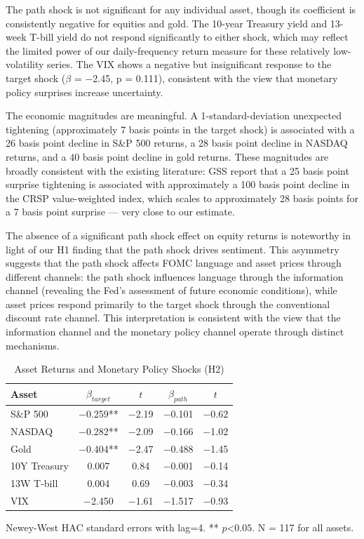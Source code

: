 \documentclass[12pt]{article}
\begin{document}
The path shock is not significant for any individual asset, though its coefficient is consistently negative for equities and gold. The 10-year Treasury yield and 13-week T-bill yield do not respond significantly to either shock, which may reflect the limited power of our daily-frequency return measure for these relatively low-volatility series. The VIX shows a negative but insignificant response to the target shock ($\beta$ = $-$2.45, p = 0.111), consistent with the view that monetary policy surprises increase uncertainty.

The economic magnitudes are meaningful. A 1-standard-deviation unexpected tightening (approximately 7 basis points in the target shock) is associated with a 26 basis point decline in S\&P 500 returns, a 28 basis point decline in NASDAQ returns, and a 40 basis point decline in gold returns. These magnitudes are broadly consistent with the existing literature: GSS report that a 25 basis point surprise tightening is associated with approximately a 100 basis point decline in the CRSP value-weighted index, which scales to approximately 28 basis points for a 7 basis point surprise --- very close to our estimate.

The absence of a significant path shock effect on equity returns is noteworthy in light of our H1 finding that the path shock drives sentiment. This asymmetry suggests that the path shock affects FOMC language and asset prices through different channels: the path shock influences language through the information channel (revealing the Fed's assessment of future economic conditions), while asset prices respond primarily to the target shock through the conventional discount rate channel. This interpretation is consistent with the view that the information channel and the monetary policy channel operate through distinct mechanisms.


\begin{table}[htbp]
\centering
\caption{Asset Returns and Monetary Policy Shocks (H2)}
\label{tab:h2}
\begin{tabular}{lcccc}
\toprule
Asset & $\beta_{target}$ & $t$ & $\beta_{path}$ & $t$ \\
\midrule
S\&P 500 & $-$0.259** & $-$2.19 & $-$0.101 & $-$0.62 \\
NASDAQ & $-$0.282** & $-$2.09 & $-$0.166 & $-$1.02 \\
Gold & $-$0.404** & $-$2.47 & $-$0.488 & $-$1.45 \\
10Y Treasury & 0.007 & 0.84 & $-$0.001 & $-$0.14 \\
13W T-bill & 0.004 & 0.69 & $-$0.003 & $-$0.34 \\
VIX & $-$2.450 & $-$1.61 & $-$1.517 & $-$0.93 \\
\bottomrule
\end{tabular}
\footnotesize{Newey-West HAC standard errors with lag=4. ** $p $<$ 0.05$. N = 117 for all assets.}
\end{table}
\end{document}
